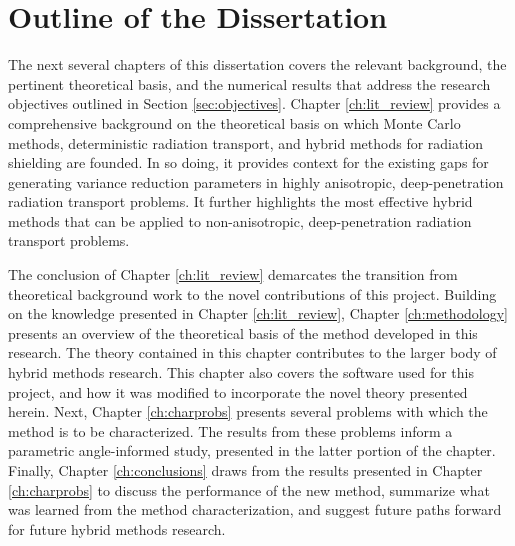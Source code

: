 \section{Outline of the Dissertation}
\label{sec:outline}

The next several chapters of this dissertation covers the relevant
background, the pertinent theoretical basis, and the numerical results that
address the research objectives outlined in Section \ref{sec:objectives}.
Chapter \ref{ch:lit_review} provides a
comprehensive background on the theoretical basis on which Monte Carlo methods,
deterministic radiation transport, and hybrid methods for radiation shielding
are founded. In so doing, it provides context for the existing gaps for
generating variance reduction parameters in
highly anisotropic, deep-penetration radiation transport problems. It
further
highlights the most effective hybrid methods that can be applied to
non-anisotropic, deep-penetration radiation transport problems.

The conclusion of Chapter \ref{ch:lit_review} demarcates the transition from
theoretical background work to the novel contributions of this project.
Building on
the knowledge presented in Chapter \ref{ch:lit_review},
Chapter \ref{ch:methodology} presents an overview of the
theoretical basis of the method developed in this research. The theory
contained in this chapter contributes to the larger body of hybrid
methods research. This chapter also covers the software used for this
project, and how it was modified to incorporate the novel theory
presented herein. Next, Chapter \ref{ch:charprobs} presents several problems
with which the method is to be characterized. The results from these problems
inform a parametric angle-informed study, presented
in the latter portion of the chapter.
Finally, Chapter \ref{ch:conclusions} draws from the
results presented in Chapter \ref{ch:charprobs} to discuss the performance of
the new method, summarize what was learned from the method characterization,
and suggest future paths forward for future hybrid methods research.



